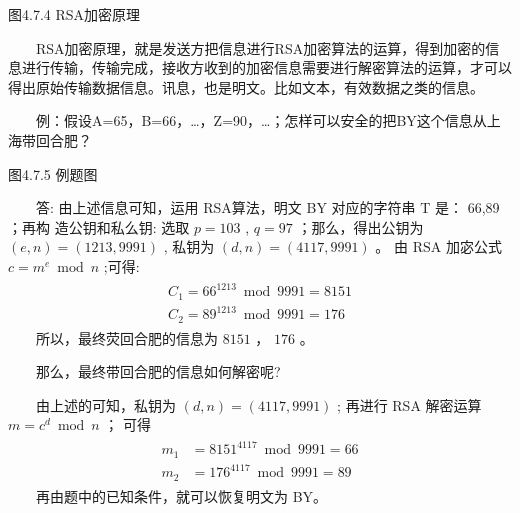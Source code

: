 \documentclass[a4paper,11pt,english]{sphinxmanual}
\begin{document}

\begin{center}图4.7.4 RSA加密原理
\end{center}
\sphinxAtStartPar
  RSA加密原理，就是发送方把信息进行RSA加密算法的运算，得到加密的信息进行传输，传输完成，接收方收到的加密信息需要进行解密算法的运算，才可以得出原始传输数据信息。讯息，也是明文。比如文本，有效数据之类的信息。

\sphinxAtStartPar
  例：假设A=65，B=66，…，Z=90，…；怎样可以安全的把BY这个信息从上海带回合肥？


\begin{center}图4.7.5 例题图
\end{center}
\sphinxAtStartPar
  答: 由上述信息可知，运用 RSA算法，明文 BY 对应的字符串 T 是： 66,89 ；再构 造公钥和私么钥: 选取  \(p=103\) , \(q=97\) ；那么，得出公钥为  \((e, n)=(1213, 9991)\) , 私钥为 \((d, n)=(4117, 9991)\) 。 由  \(\mathrm{RSA}\) 加宓公式 \(c=m^{e} \bmod n\) ;可得:
\begin{equation*}
\begin{split}\begin{array}{l} C_{1}=66^{1213} \bmod 9991=8151 \\ C_{2}=89^{1213} \bmod 9991=176 \end{array}\end{split}
\end{equation*}
\sphinxAtStartPar
  所以，最终荧回合肥的信息为 \(8151\) ， \(176\) 。

\sphinxAtStartPar
  那么，最终带回合肥的信息如何解密呢?

\sphinxAtStartPar
  由上述的可知，私钥为  \((d, n)=(4117, 9991)\) ; 再进行 RSA 解密运算  \(m=c^{d} \bmod n\) ； 可得
\begin{equation*}
\begin{split}\begin{aligned} m_{1} &=8151^{4117} \bmod 9991=66 \\ m_{2} &=176^{4117} \bmod 9991=89 \end{aligned}\end{split}
\end{equation*}
\sphinxAtStartPar
  再由题中的已知条件，就可以恢复明文为 BY。
\end{document}
